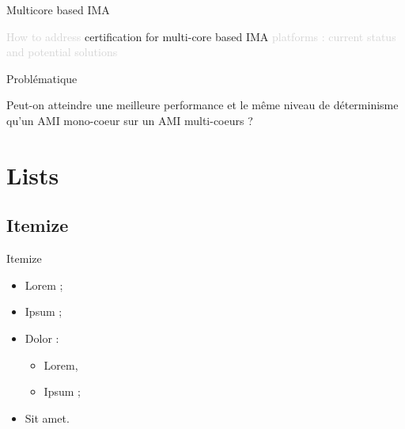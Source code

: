 \documentclass{beamer}
\begin{document}
\begin{frame}[t]{Multicore based IMA} 
  
  \begin{center}
    \begin{mdframed}[style=yellowbox]
      {\small\textcolor{lightgray}{How to address} certification for multi-core based IMA \textcolor{lightgray}{platforms :
       current status and potential solutions}}
       \end{mdframed}
  \end{center}

    \begin{block}{Problématique}

    Peut-on atteindre une meilleure performance et le même niveau de déterminisme qu'un AMI mono-coeur sur un 
    AMI multi-coeurs ?

  \end{block}
 
\end{frame}

\section{Lists} 
\subsection{Itemize}

\begin{frame}{Itemize}
  \begin{itemize}
    \item Lorem ; \pause
    \item Ipsum ;
    \item Dolor : \pause
      \begin{itemize}
        \item Lorem,
        \item Ipsum ;
      \end{itemize}
    \item Sit amet.
  \end{itemize} 
\end{frame}
\end{document}
